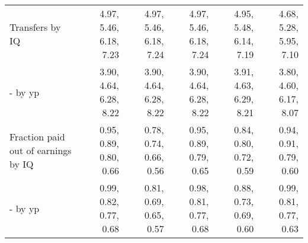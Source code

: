 \begin{tabular}{lrrrrr}
Transfers by IQ & 4.97, 5.46, 6.18, 7.23  & 4.97, 5.46, 6.18, 7.24  & 4.97, 5.46, 6.18, 7.24  & 4.95, 5.48, 6.14, 7.19  & 4.68, 5.28, 5.95, 7.10  \\ 
- by yp & 3.90, 4.64, 6.28, 8.22  & 3.90, 4.64, 6.28, 8.22  & 3.90, 4.64, 6.28, 8.22  & 3.91, 4.63, 6.29, 8.21  & 3.80, 4.60, 6.17, 8.07  \\ 
Fraction paid out of earnings by IQ & 0.95, 0.89, 0.80, 0.66  & 0.78, 0.74, 0.66, 0.56  & 0.95, 0.89, 0.79, 0.65  & 0.84, 0.80, 0.72, 0.59  & 0.94, 0.91, 0.79, 0.60  \\ 
- by yp & 0.99, 0.82, 0.77, 0.68  & 0.81, 0.69, 0.65, 0.57  & 0.98, 0.81, 0.77, 0.68  & 0.88, 0.73, 0.69, 0.60  & 0.99, 0.81, 0.77, 0.63  \\ 
\hline
\end{tabular}%
